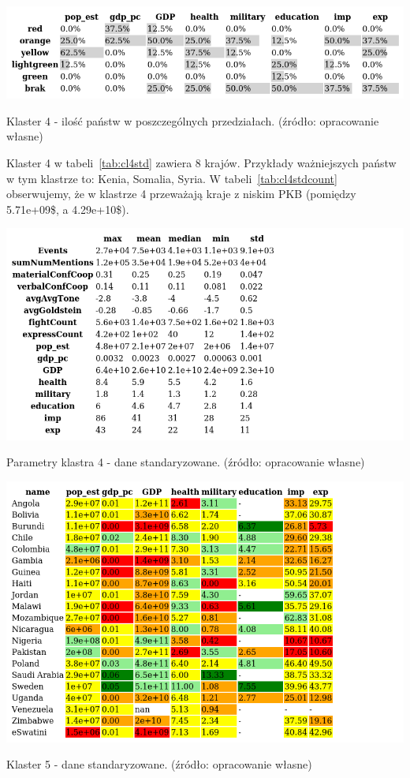 \documentclass[11pt]{report}
\begin{document}
    \begin{table}[!htp]
        \centering
        \includegraphics[width=\linewidth]{tables/CLUST/cluster4stdkmeanscount.png}
        \caption{Klaster 4 - ilość państw w poszczególnych przedziałach. (źródło: opracowanie własne)}
        \label{tab:cl4stdcount}
    \end{table}

    Klaster 4 w tabeli~\ref{tab:cl4std} zawiera 8 krajów.
    Przykłady ważniejszych państw w tym klastrze to: Kenia, Somalia, Syria.
    W tabeli~\ref{tab:cl4stdcount} obserwujemy, że w klastrze 4 przeważają kraje z niskim PKB (pomiędzy 5.71e+09\$, a 4.29e+10\$).

    \begin{table}[!htp]
        \centering
        \includegraphics[width=\linewidth]{tables/CLUST/desc/clust4std_desc.png}
        \caption{Parametry klastra 4 - dane standaryzowane. (źródło: opracowanie własne)}
        \label{tab:cl4std_desc}
    \end{table}

    \begin{table}[!htp]
        \centering
        \includegraphics[width=\linewidth]{tables/CLUST/cluster5stdkmeans.png}
        \caption{Klaster 5 - dane standaryzowane. (źródło: opracowanie własne)}
        \label{tab:cl5std}
    \end{table}
\end{document}
